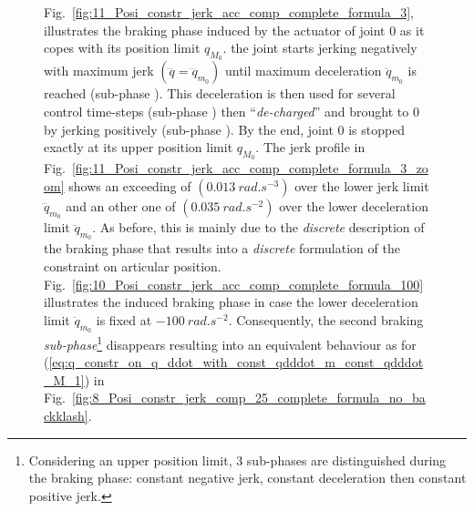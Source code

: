 \begin{figure}[!htbp]
Fig.~\ref{fig:11_Posi_constr_jerk_acc_comp_complete_formula_3}, illustrates the braking phase induced by the actuator of joint $0$ as it copes with its position limit $q_{M_{0}}$. the joint starts jerking negatively with maximum jerk $(\dddot{q} = \dddot{q}_{m_{0}})$  until maximum deceleration $\ddot{q}_{m_{0}}$ is reached (sub-phase ). This deceleration is then used for several control time-steps (sub-phase ) then ``\textit{de-charged}'' and brought to $0$ by jerking positively (sub-phase ). By the end, joint $0$ is stopped exactly at its upper position limit $q_{M_{0}}$. The jerk profile in Fig.~\ref{fig:11_Posi_constr_jerk_acc_comp_complete_formula_3_zoom} shows an exceeding of $(0.013~rad.s^{-3})$ over the lower jerk limit $\dddot{q}_{m_{0}}$ and an other one of $(0.035~rad.s^{-2})$ over the lower deceleration limit $\ddot{q}_{m_{0}}$. As before, this is mainly due to the \textit{discrete} description of the braking phase that results into a \textit{discrete} formulation of the constraint on articular position. \\ 
Fig.~\ref{fig:10_Posi_constr_jerk_acc_comp_complete_formula_100} illustrates the induced braking phase in case the lower deceleration limit $\ddot{q}_{m_{0}}$ is fixed at $-100~rad.s^{-2}$. Consequently, the second braking \textit{sub-phase}\footnote{Considering an upper position limit, 3 sub-phases are distinguished during the  braking phase: constant negative jerk, constant deceleration then constant positive jerk.} disappears resulting into an equivalent behaviour as for (\ref{eq:q_constr_on_q_ddot_with_const_qdddot_m_const_qdddot_M_1}) in Fig.~\ref{fig:8_Posi_constr_jerk_comp_25_complete_formula_no_backklash}.

\end{figure}
